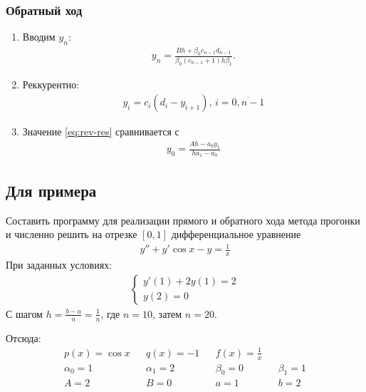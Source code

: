 \subsubsection{Обратный ход}
\begin{enumerate}
  \item Вводим \(y_n\):
    \begin{align}
    y_n=\frac{Bh+\beta_0c_{n-1}d_{n-1}}{\beta_0(c_{n-1}+1)h\beta_1}.
    \end{align}
  \item Реккурентно:
    \begin{align}\label{eq:rev-res}
      y_i=c_i(d_i-y_{i+1}),\, i=\overline{0,n-1}
    \end{align}
  \item Значение \cref{eq:rev-res} сравнивается с 
    \begin{align}
      y_0=\frac{Ah-a_0y_1}{ha_1-a_0}
    \end{align}
\end{enumerate}
\subsection{Для примера}

Составить программу для реализации прямого и обратного хода метода прогонки и численно решить на отрезке \([0,1]\) дифференциальное уравнение
\begin{align*}
	y'' + y' \cos x - y = \frac{1}{x}
\end{align*}
При заданных условиях:
\begin{align*}
	\begin{cases}
		y'(1)+2y(1) = 2 \\
		y(2)        = 0
	\end{cases}
\end{align*}
С шагом \(h=\frac{b-a}{n}=\frac{1}{n}\), где \(n = 10\), затем \(n=20\).

Отсюда:
\begin{align*}
  p(x)=\cos x & & q(x) = -1 & & f(x)=\frac{1}{x}\\
  \alpha_0 = 1 && \alpha_1 = 2 & & \beta_0 = 0 & & \beta_1 = 1 \\
  A = 2 && B = 0 && a = 1 && b = 2
\end{align*}
